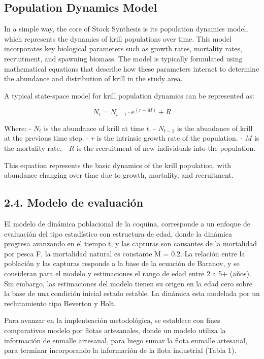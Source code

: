 \documentclass[
]{article}
\begin{document}
\hypertarget{population-dynamics-model}{%
\subsection{Population Dynamics Model}\label{population-dynamics-model}}

In a simple way, the core of Stock Synthesis is its population dynamics model, which represents the dynamics of krill populations over time. This model incorporates key biological parameters such as growth rates, mortality rates, recruitment, and spawning biomass. The model is typically formulated using mathematical equations that describe how these parameters interact to determine the abundance and distribution of krill in the study area.

A typical state-space model for krill population dynamics can be represented as:

\[
N_t = N_{t-1} \cdot e^{(r - M)} + R
\]

Where:
- \(N_t\) is the abundance of krill at time \(t\).
- \(N_{t-1}\) is the abundance of krill at the previous time step.
- \(r\) is the intrinsic growth rate of the population.
- \(M\) is the mortality rate.
- \(R\) is the recruitment of new individuals into the population.

This equation represents the basic dynamics of the krill population, with abundance changing over time due to growth, mortality, and recruitment.

\hypertarget{modelo-de-evaluaciuxf3n}{%
\subsection{2.4. Modelo de evaluación}\label{modelo-de-evaluaciuxf3n}}

El modelo de dinámica poblacional de la coquina, corresponde a un enfoque de evaluación del tipo estadístico con estructura de edad, donde la dinámica progresa avanzando en el tiempo t, y las capturas son causantes de la mortalidad por pesca F, la mortalidad natural es constante M = 0.2. La relación entre la población y las capturas responde a la base de la ecuación de Baranov, y se consideran para el modelo y estimaciones el rango de edad entre 2 a 5+ (años). Sin embargo, las estimaciones del modelo tienen su origen en la edad cero sobre la base de una condición inicial estado estable. La dinámica esta modelada por un reclutamiento tipo Beverton y Holt.

Para avanzar en la implenteación metodológica, se establece con fines comparativos modelo por flotas artesanales, donde un modelo utiliza la información de enmalle artesanal, para luego sumar la flota enmalle artesanal, para terminar incorporando la información de la flota industrial (Tabla 1).
\end{document}
